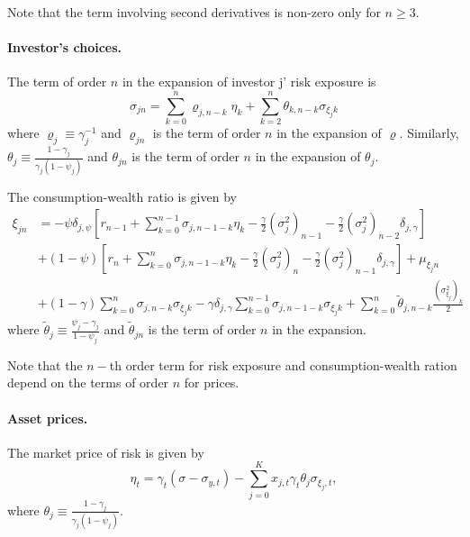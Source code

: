 \documentclass[11pt,english]{article}
\begin{document}
Note that the term involving second derivatives is non-zero only for $n\geq 3$. 

\paragraph{Investor's choices.} The term of order $n$ in the expansion of investor j' risk exposure is
\begin{equation*}
    \sigma_{jn} = \sum_{k=0}^n \varrho_{j,n-k} \eta_k + \sum_{k=2}^n \theta_{k,n-k} \sigma_{\xi_jk} 
\end{equation*}
where $\varrho_j \equiv \gamma_{j}^{-1}$ and $\varrho_{jn}$ is the term of order $n$ in the expansion of $\varrho$. Similarly, $\theta_{j} \equiv \frac{1-\gamma_j}{\gamma_j (1-\psi_j)}$ and $\theta_{jn}$ is the term of order $n$ in the expansion of $\theta_j$.

The consumption-wealth ratio is given by
\begin{align*}
    \xi_{jn} &= -\psi \delta_{j,\psi} \left[ r_{n-1} + \sum_{k=0}^{n-1}\sigma_{j,n-1-k} \eta_k - \frac{\gamma}{2}  (\sigma_{j}^2)_{n-1}    - \frac{\gamma}{2}  (\sigma_{j}^2)_{n-2} \delta_{j,\gamma}    \right]\\
    &+(1-\psi) \left[r_{n} + \sum_{k=0}^{n}\sigma_{j,n-1-k} \eta_k - \frac{\gamma}{2}  (\sigma_{j}^2)_{n}    - \frac{\gamma}{2}  (\sigma_{j}^2)_{n-1} \delta_{j,\gamma}   \right] + \mu_{\xi_jn} \\
    &+ (1-\gamma) \sum_{k=0}^n \sigma_{j,n-k} \sigma_{\xi_jk}-\gamma \delta_{j,\gamma} \sum_{k=0}^{n-1} \sigma_{j,n-1-k} \sigma_{\xi_jk}
    + \sum_{k=0}^n \tilde{\theta}_{j,n-k}\frac{(\sigma_{\xi_j}^2)_k}{2}
\end{align*}
where $\tilde{\theta}_{j} \equiv \frac{\psi_j - \gamma_j}{1-\psi_j} $ and $\tilde{\theta}_{jn}$ is the term of order $n$ in the expansion.

Note that the $n-$th order term for risk exposure and consumption-wealth ration depend on the terms of order $n$ for prices.

\paragraph{Asset prices.} The market price of risk is given by
\begin{equation}
    \eta_t = \gamma_t (\sigma - \sigma_{y,t}) - \sum_{j=0}^K x_{j,t}\gamma_t  \theta_j \sigma_{\xi_j,t}, 
\end{equation}
where $\theta_j \equiv \frac{1-\gamma_j}{\gamma_j (1-\psi_j)}$.
\end{document}
